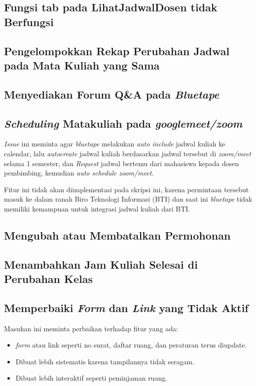 \subsection{Fungsi tab pada LihatJadwalDosen tidak Berfungsi}
\label{issue:7}
\subsection{Pengelompokkan Rekap Perubahan Jadwal pada Mata Kuliah yang Sama}
\label{issue:8}
\subsection{Menyediakan Forum Q\&A pada \textit{Bluetape}}
\label{issue:9}
\subsection{\textit{Scheduling} Matakuliah pada \textit{googlemeet/zoom}}
\label{issue:10}
\textit{Issue} ini meminta agar \textit{bluetape} melakukan \textit{auto include} jadwal kuliah ke calendar, lalu \textit{autocreate} jadwal kuliah berdasarkan jadwal tersebut di \textit{zoom/meet} selama 1 semester, dan \textit{Request} jadwal bertemu dari mahasiswa kepada dosen pembimbing, kemudian \textit{auto schedule zoom/meet}.

Fitur ini tidak akan diimplementasi pada skripsi ini, karena permintaan tersebut masuk ke dalam ranah Biro Teknologi Informasi (BTI) dan saat ini \textit{bluetape} tidak memiliki kemampuan untuk integrasi jadwal kuliah dari BTI.

\subsection{Mengubah atau Membatalkan Permohonan}
\label{issue:11}
\subsection{Menambahkan Jam Kuliah Selesai di Perubahan Kelas}
\label{issue:12}

\subsection{Memperbaiki \textit{Form} dan \textit{Link} yang Tidak Aktif}
\label{issue:13}
Masukan ini meminta perbaikan terhadap fitur yang ada: 
\begin{itemize}
	\item \textit{form} atau link seperti no surat, daftar ruang, dan peraturan terus diupdate.
	\item Dibuat lebih sistematis karena tampilannya tidak seragam.
	\item Dibuat lebih interaktif seperti peminjaman ruang.
\end{itemize}   

